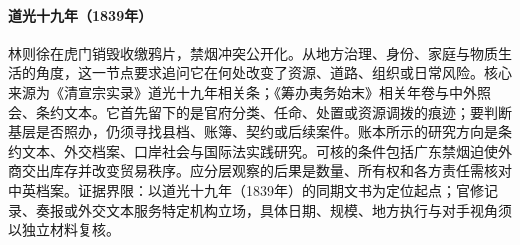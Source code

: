 \hypertarget{social:EQ-1839-HUMEN-OPIUM-DESTRUCTION}{}\paragraph{道光十九年（1839年）}林则徐在虎门销毁收缴鸦片，禁烟冲突公开化。从地方治理、身份、家庭与物质生活的角度，这一节点要求追问它在何处改变了资源、道路、组织或日常风险。核心来源为《清宣宗实录》道光十九年相关条；《筹办夷务始末》相关年卷与中外照会、条约文本。它首先留下的是官府分类、任命、处置或资源调拨的痕迹；要判断基层是否照办，仍须寻找县档、账簿、契约或后续案件。账本所示的研究方向是条约文本、外交档案、口岸社会与国际法实践研究。可核的条件包括广东禁烟迫使外商交出库存并改变贸易秩序。应分层观察的后果是数量、所有权和各方责任需核对中英档案。证据界限：以道光十九年（1839年）的同期文书为定位起点；官修记录、奏报或外交文本服务特定机构立场，具体日期、规模、地方执行与对手视角须以独立材料复核。
